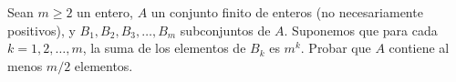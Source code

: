 Sean $m \ge 2$ un entero, $A$ un conjunto finito de enteros (no necesariamente positivos), y $B_1,B_2,B_3,\dots,B_m$ subconjuntos de $A$. Suponemos que para cada $k = 1,2,\dots,m$, la suma de los elementos de $B_k$ es $m^k$. Probar que $A$ contiene al menos $m/2$ elementos.